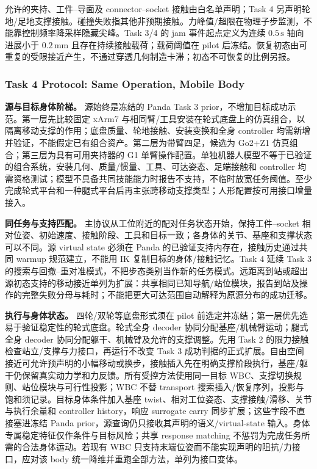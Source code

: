 \documentclass[11pt]{article}
\begin{document}
允许的夹持、工件--导面及 connector--socket 接触由白名单声明；Task 4 另声明轮地/足地支撑接触。碰撞失败指其他非预期接触。力峰值/超限在物理子步监测，不能靠控制频率降采样隐藏尖峰。Task 3/4 的 jam 事件起点定义为连续 $0.5\,\mathrm{s}$ 轴向进展小于 $0.2\,\mathrm{mm}$ 且存在持续接触载荷；载荷阈值在 pilot 后冻结。恢复初态由可重复的受限接近产生，不通过穿透几何制造卡滞；初态不可恢复的比例另报。

\subsubsection{Task 4 Protocol: Same Operation, Mobile Body}
\label{sec:task4}
\textbf{源与目标身体阶梯。} 源始终是冻结的 Panda Task 3 prior，不增加目标成功示范。第一层先比较固定 xArm7 与相同臂/工具安装在轮式底盘上的仿真组合，以隔离移动支撑的作用；底盘质量、轮地接触、安装变换和全身 controller 均需新增并验证，不能假定已有组合资产。第二层为带臂四足，候选为 Go2+Z1 仿真组合；第三层为具有可用夹持器的 G1 单臂操作配置。单独机器人模型不等于已验证的组合系统，安装几何、质量/惯量、工具、可达姿态、足端接触和 controller 均需资格测试；模型不具备共同技能能力时报告不支持，不临时放宽任务阈值。至少完成轮式平台和一种腿式平台后再主张跨移动支撑类型；人形配置按可用接口增量接入。

\textbf{同任务与支持匹配。} 主协议从工位附近的配对任务状态开始，保持工件--socket 相对位姿、初始速度、接触阶段、工具和目标一致；各身体的关节、基座和支撑状态可以不同。源 virtual state 必须在 Panda 的已验证支持内存在，接触历史通过共同 warmup 规范建立，不能用 IK 复制目标的身体/接触记忆。Task 4 延续 Task 3 的搜索与回撤--重对准模式，不把步态类别当作新的任务模式。远距离到站或超出源初态支持的移动接近单列为扩展：共享相同已知导航/站位模块，报告到站及操作的完整失败分母与耗时；不能把更大可达范围自动解释为原源分布的成功迁移。

\textbf{执行与身体状态。} 四轮/双轮等底盘形式须在 pilot 前选定并冻结；第一层优先选易于验证稳定性的轮式底盘。轮式全身 decoder 协同分配基座/机械臂运动；腿式全身 decoder 协同分配躯干、机械臂及允许的支撑调整。先用 Task 2 的限力接触检查站立/支撑与力接口，再运行不改变 Task 3 成功判据的正式扩展。自由空间接近可允许预声明的小幅移动或换步，接触插入先在明确支撑阶段执行，基座/躯干仍保留真实动力学和力反馈。所有受控方法使用同一目标 WBC、支撑切换规则、站位模块与可行性投影；WBC 不替 transport 搜索插入/恢复序列，投影与饱和须记录。目标身体条件加入基座 twist、相对工位姿态、支撑接触/滑移、关节与执行余量和 controller history，响应 surrogate carry 同步扩展；这些字段不直接塞进冻结 Panda prior，源查询仍只接收其声明的语义/virtual-state 输入。身体专属稳定特征仅作条件与目标风险；共享 response matching 不惩罚为完成任务所需的合法身体运动。若现有 WBC 只支持末端位姿而不能实现声明的阻抗/力接口，应对该 body 统一降维并重跑全部方法，单列为接口变体。
\end{document}
